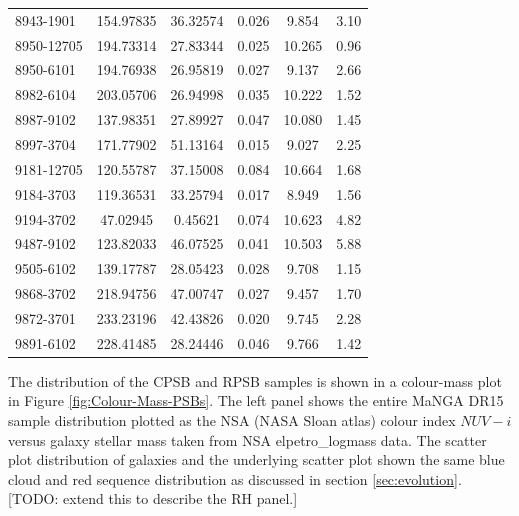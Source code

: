 \begin{table}
\begin{tabular}{lccccc}
8943-1901 & 154.97835 & 36.32574 & 0.026 & 9.854 & 3.10 \\
8950-12705 & 194.73314 & 27.83344 & 0.025 & 10.265 & 0.96 \\
8950-6101 & 194.76938 & 26.95819 & 0.027 & 9.137 & 2.66 \\
8982-6104 & 203.05706 & 26.94998 & 0.035 & 10.222 & 1.52 \\
8987-9102 & 137.98351 & 27.89927 & 0.047 & 10.080 & 1.45 \\
8997-3704 & 171.77902 & 51.13164 & 0.015 & 9.027 & 2.25 \\
9181-12705 & 120.55787 & 37.15008 & 0.084 & 10.664 & 1.68 \\
9184-3703 & 119.36531 & 33.25794 & 0.017 & 8.949 & 1.56 \\
9194-3702 & 47.02945 & 0.45621 & 0.074 & 10.623 & 4.82 \\
9487-9102 & 123.82033 & 46.07525 & 0.041 & 10.503 & 5.88 \\
9505-6102 & 139.17787 & 28.05423 & 0.028 & 9.708 & 1.15 \\
9868-3702 & 218.94756 & 47.00747 & 0.027 & 9.457 & 1.70 \\
9872-3701 & 233.23196 & 42.43826 & 0.020 & 9.745 & 2.28 \\
9891-6102 & 228.41485 & 28.24446 & 0.046 & 9.766 & 1.42 \\
\hline
\end{tabular}
\end{table}

The distribution of the CPSB and RPSB samples is shown in a colour-mass plot in Figure \ref{fig:Colour-Mass-PSBs}. The left panel shows the entire MaNGA DR15 sample distribution plotted as the NSA (NASA Sloan atlas) colour index $NUV - i$ versus galaxy stellar mass taken from NSA elpetro\_logmass data. The scatter plot distribution of galaxies and the underlying scatter plot shown the same blue cloud and red sequence distribution as discussed in section \ref{sec:evolution}. [TODO: extend this to describe the RH panel.]

